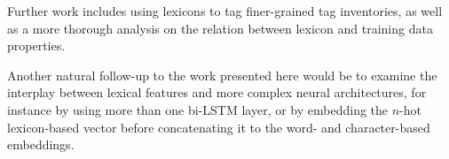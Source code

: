 \documentclass[11pt,a4paper]{article}
\begin{document}
Further work includes using lexicons to tag finer-grained tag inventories, as well as a more thorough analysis on the
relation between lexicon and training data properties.

Another natural follow-up to the work presented here would be to examine the interplay between lexical features and more
complex neural architectures, for instance by using more than one bi-LSTM layer, or by embedding the $n$-hot lexicon-based
vector before concatenating it to the word- and character-based embeddings.





\end{document}
